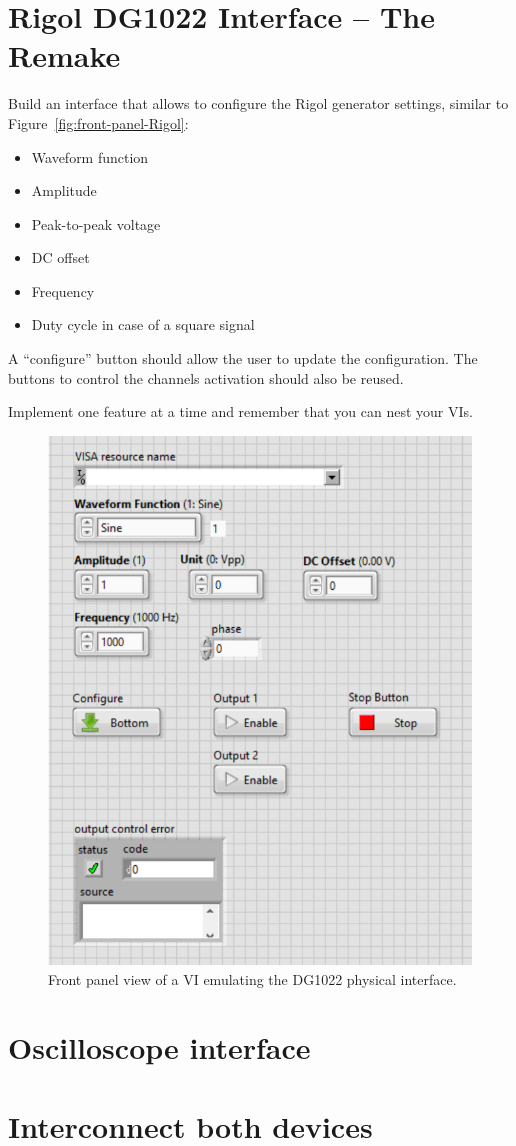 \documentclass{labo}
\begin{document}
\section{Rigol DG1022 Interface -- The Remake}
Build an interface that allows to configure the Rigol generator settings, similar to Figure~\vref{fig:front-panel-Rigol}:
\begin{itemize}
  \item Waveform function
  \item Amplitude
  \item Peak-to-peak voltage
  \item DC offset
  \item Frequency
  \item Duty cycle in case of a square signal
\end{itemize}
A ``configure'' button should allow the user to update the configuration.
The buttons to control the channels activation should also be reused.

Implement one feature at a time and remember that you can nest your VIs.

\begin{figure}[ht!]
\centering
\includegraphics[width=.5\linewidth]{front-panel-Rigol.png}
\caption{Front panel view of a VI emulating the DG1022 physical interface.}
\label{fig:front-panel-Rigol}
\end{figure}



\section{Oscilloscope interface}



\section{Interconnect both devices}
\end{document}
